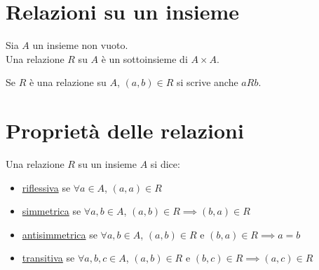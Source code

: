 \documentclass[a4paper,12pt, oneside]{book}
\begin{document}
\section{Relazioni su un insieme}
\begin{definizione}
	Sia $A$ un insieme non vuoto.\\
	Una relazione $R$ su $A$ è un sottoinsieme di $A \times A$.
\end{definizione}
\begin{nota}
	Se $R$ è una relazione su $A$, $(a,b) \in R$ si scrive anche $aRb$.
\end{nota}
\section{Proprietà delle relazioni}
\begin{definizione}
	Una relazione $R$ su un insieme $A$ si dice:
	\begin{itemize}
		\item \underline{riflessiva} se $\forall a \in A$, $(a,a) \in R$
		\item \underline{simmetrica} se $\forall a,b \in A$, $(a,b) \in R \implies (b,a) \in R$
		\item \underline{antisimmetrica} se $\forall a,b \in A$, $(a,b) \in R$ e $(b,a) \in R \implies a=b$
		\item \underline{transitiva} se $\forall a,b,c \in A$, $(a,b) \in R$ e $(b,c) \in R \implies (a,c) \in R$
	\end{itemize}
\end{definizione}
\end{document}
